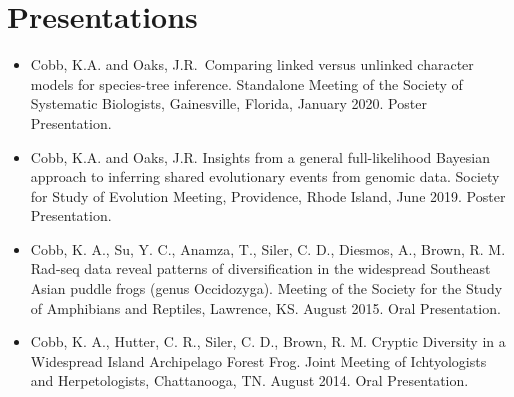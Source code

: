 \section*{Presentations}

\begin{itemize}[leftmargin=3em, label={}, itemindent=-2em]

\item Cobb, K.A. and Oaks, J.R. Comparing linked versus unlinked character models
for species-tree inference. Standalone Meeting of the Society of Systematic
Biologists, Gainesville, Florida, January 2020. Poster Presentation.

\item Cobb, K.A. and Oaks, J.R. Insights from a general full-likelihood Bayesian
approach to inferring shared evolutionary events from genomic data. Society for 
Study of Evolution Meeting, Providence, Rhode Island, June 2019. 
Poster Presentation.

\item Cobb, K. A., Su, Y. C., Anamza, T., Siler, C. D., Diesmos, A., Brown, R. M.
Rad-seq data reveal patterns of diversification in the widespread Southeast
Asian puddle frogs (genus Occidozyga). Meeting of the Society for the Study of 
Amphibians and Reptiles, Lawrence, KS. August 2015. Oral Presentation.

\item Cobb, K. A., Hutter, C. R., Siler, C. D., Brown, R. M. Cryptic Diversity
in a Widespread Island Archipelago Forest Frog. Joint Meeting of Ichtyologists 
and Herpetologists, Chattanooga, TN. August 2014. Oral Presentation.

\end{itemize}
